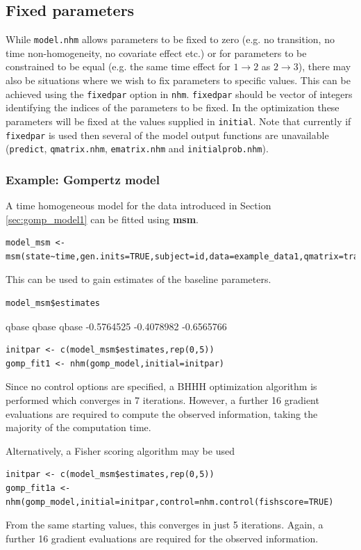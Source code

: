 \documentclass{article}
\numberwithin{equation}{section}
\begin{document}
\subsection{Fixed parameters}

While \verb!model.nhm! allows parameters to be fixed to zero (e.g. no transition, no time non-homogeneity, no covariate effect etc.) or for parameters to be constrained to be equal (e.g. the same time effect for $1 \rightarrow 2$ as $2 \rightarrow 3$), there may also be situations where we wish to fix parameters to specific values. This can be achieved using the \verb!fixedpar! option in \verb!nhm!. \verb!fixedpar! should be vector of integers identifying the indices of the parameters to be fixed. In the optimization these parameters will be fixed at the values supplied in \verb!initial!.  Note that currently if \verb!fixedpar! is used then several of the model output functions are unavailable (\verb!predict!, \verb!qmatrix.nhm!, \verb!ematrix.nhm! and \verb!initialprob.nhm!). 

\subsubsection{Example: Gompertz model}
\label{sec:gomp_model2}

A time homogeneous model for the data introduced in Section \ref{sec:gomp_model1} can be fitted using {\bf msm}. 

\begin{verbatim}
model_msm <- msm(state~time,gen.inits=TRUE,subject=id,data=example_data1,qmatrix=trans)
\end{verbatim}
This can be used to gain estimates of the baseline parameters.
\begin{verbatim}
model_msm$estimates
\end{verbatim}
\begin{verbout}
     qbase      qbase      qbase 
-0.5764525 -0.4078982 -0.6565766 
\end{verbout}

\begin{verbatim}
initpar <- c(model_msm$estimates,rep(0,5))
gomp_fit1 <- nhm(gomp_model,initial=initpar)
\end{verbatim}
Since no control options are specified, a BHHH optimization algorithm is performed which converges in 7 iterations. However, a further 16 gradient evaluations are required to compute the observed information, taking the majority of the computation time. 

Alternatively, a Fisher scoring algorithm may be used
\begin{verbatim}
initpar <- c(model_msm$estimates,rep(0,5))
gomp_fit1a <- nhm(gomp_model,initial=initpar,control=nhm.control(fishscore=TRUE)
\end{verbatim}
From the same starting values, this converges in just 5 iterations. Again, a further 16 gradient evaluations are required for the observed information. 
\end{document}
